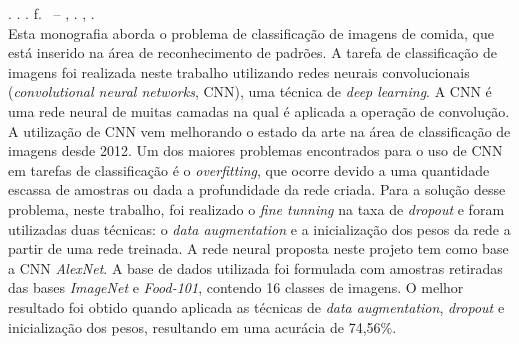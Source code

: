 
\begin{resumo}[RESUMO]
\begin{SingleSpacing}

\imprimirautorcitacao. \imprimirtitulo. \imprimirdata. \pageref {LastPage} f. \imprimirprojeto\ – \imprimirprograma, \imprimirinstituicao. \imprimirlocal, \imprimirdata.\\


Esta monografia aborda o problema de classificação de imagens de comida, que está inserido na área de reconhecimento de padrões. A tarefa de classificação de imagens foi realizada neste trabalho utilizando redes neurais convolucionais (\textit{convolutional neural networks}, CNN), uma técnica de \textit{deep learning}. A CNN é uma rede neural de muitas camadas na qual é aplicada a operação de convolução. A utilização de CNN vem melhorando o estado da arte na área de classificação de imagens desde 2012. Um dos maiores problemas encontrados para o uso de CNN em tarefas de classificação é o \textit{overfitting}, que ocorre devido a uma quantidade escassa de amostras ou dada a profundidade da rede criada. Para a solução desse problema, neste trabalho, foi realizado o \textit{fine tunning} na taxa de \textit{dropout} e foram utilizadas duas técnicas: o \textit{data augmentation} e a inicialização dos pesos da rede a partir de uma rede treinada. A rede neural proposta neste projeto tem como base a CNN \textit{AlexNet}. A base de dados utilizada foi formulada com amostras retiradas das bases \textit{ImageNet} e \textit{Food-101}, contendo 16 classes de imagens. O melhor resultado foi obtido quando aplicada as técnicas de \textit{data augmentation}, \textit{dropout} e inicialização dos pesos, resultando em uma acurácia de 74,56\%.





\end{SingleSpacing}
\end{resumo}
